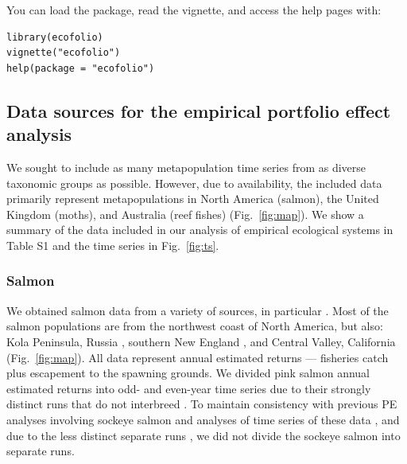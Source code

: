 
\noindent
You can load the package, read the vignette, and access the help pages with:

\begin{verbatim}
library(ecofolio)
vignette("ecofolio")
help(package = "ecofolio")
\end{verbatim}

\subsection{Data sources for the empirical portfolio effect analysis}
We sought to include as many metapopulation time series from as diverse
taxonomic groups as possible. However, due to availability, the included data
primarily represent metapopulations in North America (salmon), the United
Kingdom (moths), and Australia (reef fishes) (Fig.~\ref{fig:map}). We show a
summary of the data included in our analysis of empirical ecological systems
in Table S1 and the time series in Fig.~\ref{fig:ts}.

\subsubsection{Salmon}
We obtained salmon data from a variety of sources, in particular
\citet{dorner2008}. Most of the salmon populations are from the northwest
coast of North America, but also: Kola Peninsula, Russia
\citep{jensen1999}, southern New England \citep{kocik2006}, and
Central Valley, California \citep{carlson2011} (Fig.~\ref{fig:map}). All
data represent annual estimated returns --- fisheries catch plus escapement to
the spawning grounds. We divided pink salmon annual estimated returns into odd-
and even-year time series due to their strongly distinct runs that do not
interbreed \citep{quinn2005}. To maintain consistency with previous PE
analyses involving sockeye salmon \citep{schindler2010} and analyses of
time series of these data \citep{dorner2008}, and due to the less distinct
separate runs \citep{quinn2005}, we did not divide the sockeye salmon into
separate runs.


